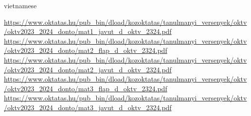 \documentclass{article}
\begin{document}
\begin{otherlanguage*}{vietnamese}
\begin{thebibliography}{99}
     \url{https://www.oktatas.hu/pub_bin/dload/kozoktatas/tanulmanyi_versenyek/oktv/oktv2023_2024_donto/mat1_javut_d_oktv_2324.pdf}
     \url{https://www.oktatas.hu/pub_bin/dload/kozoktatas/tanulmanyi_versenyek/oktv/oktv2023_2024_donto/mat2_flap_d_oktv_2324.pdf}
     \url{https://www.oktatas.hu/pub_bin/dload/kozoktatas/tanulmanyi_versenyek/oktv/oktv2023_2024_donto/mat2_javut_d_oktv_2324.pdf}
     \url{https://www.oktatas.hu/pub_bin/dload/kozoktatas/tanulmanyi_versenyek/oktv/oktv2023_2024_donto/mat3_flap_d_oktv_2324.pdf}
     \url{https://www.oktatas.hu/pub_bin/dload/kozoktatas/tanulmanyi_versenyek/oktv/oktv2023_2024_donto/mat3_javut_d_oktv_2324.pdf}
\end{thebibliography}

\end{otherlanguage*}
\end{document}
